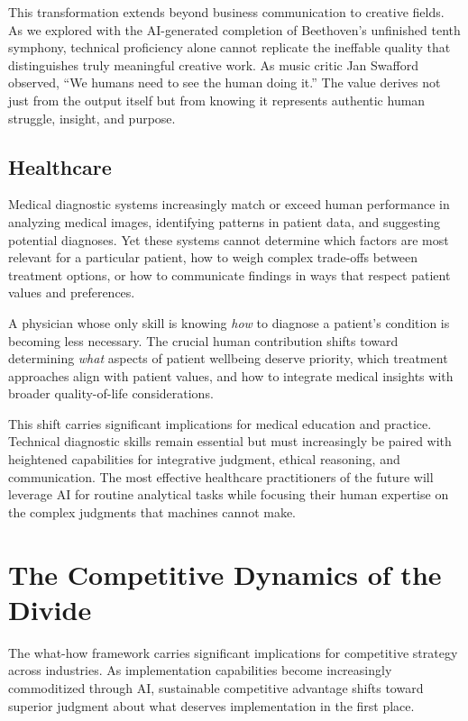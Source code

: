 \documentclass[
  Letterpaper,
]{scrbook}
\begin{document}
This transformation extends beyond business communication to creative
fields. As we explored with the AI-generated completion of Beethoven's
unfinished tenth symphony, technical proficiency alone cannot replicate
the ineffable quality that distinguishes truly meaningful creative work.
As music critic Jan Swafford observed, ``We humans need to see the human
doing it.'' The value derives not just from the output itself but from
knowing it represents authentic human struggle, insight, and purpose.

\subsection{Healthcare}\label{healthcare}

Medical diagnostic systems increasingly match or exceed human
performance in analyzing medical images, identifying patterns in patient
data, and suggesting potential diagnoses. Yet these systems cannot
determine which factors are most relevant for a particular patient, how
to weigh complex trade-offs between treatment options, or how to
communicate findings in ways that respect patient values and
preferences.

A physician whose only skill is knowing \emph{how} to diagnose a
patient's condition is becoming less necessary. The crucial human
contribution shifts toward determining \emph{what} aspects of patient
wellbeing deserve priority, which treatment approaches align with
patient values, and how to integrate medical insights with broader
quality-of-life considerations.

This shift carries significant implications for medical education and
practice. Technical diagnostic skills remain essential but must
increasingly be paired with heightened capabilities for integrative
judgment, ethical reasoning, and communication. The most effective
healthcare practitioners of the future will leverage AI for routine
analytical tasks while focusing their human expertise on the complex
judgments that machines cannot make.

\section{The Competitive Dynamics of the
Divide}\label{the-competitive-dynamics-of-the-divide}

The what-how framework carries significant implications for competitive
strategy across industries. As implementation capabilities become
increasingly commoditized through AI, sustainable competitive advantage
shifts toward superior judgment about what deserves implementation in
the first place.
\end{document}
